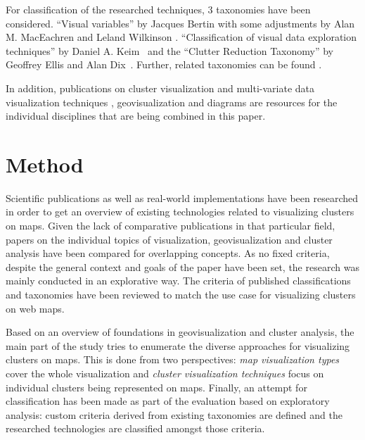 For classification of the researched techniques, 3 taxonomies have been considered. ``Visual variables'' by Jacques Bertin \cite{bertin67graphics, bertin83graphics} with some adjustments by Alan M. MacEachren \cite{MacEachren95maps} and Leland Wilkinson \cite{Wilkinson05grammar}. ``Classification of visual data exploration techniques'' by Daniel A. Keim~\cite{keim2001vis} and the ``Clutter Reduction Taxonomy'' by Geoffrey Ellis and Alan Dix~\cite{ellis08clutter}. Further, related taxonomies can be found \cite{lohse, shneiderman}.
 
In addition, publications on cluster visualization and multi-variate data visualization techniques \cite{ward02glyphs, zhang07thesis, ElmqvistDGHF08, hiervis}, geovisualization \cite{noellenburg11geovis, maceachren-geovis, MacEachren07cartovis} and diagrams \cite{ladenhauf12dia} are resources for the individual disciplines that are being combined in this paper.



\section{Method}

Scientific publications as well as real-world implementations have been researched in order to get an overview of existing technologies related to visualizing clusters on maps. Given the lack of comparative publications in that particular field, papers on the individual topics of visualization, geovisualization and cluster analysis have been compared for overlapping concepts. As no fixed criteria, despite the general context and goals of the paper have been set, the research was mainly conducted in an explorative way. The criteria of published classifications and taxonomies have been reviewed to match the use case for visualizing clusters on web maps.

Based on an overview of foundations in geovisualization and cluster analysis, the main part of the study tries to enumerate the diverse approaches for visualizing clusters on maps. This is done from two perspectives: \textit{map visualization types} cover the whole visualization and \textit{cluster visualization techniques} focus on individual clusters being represented on maps. Finally, an attempt for classification has been made as part of the evaluation based on exploratory analysis: custom criteria derived from existing taxonomies are defined and the researched technologies are classified amongst those criteria.







